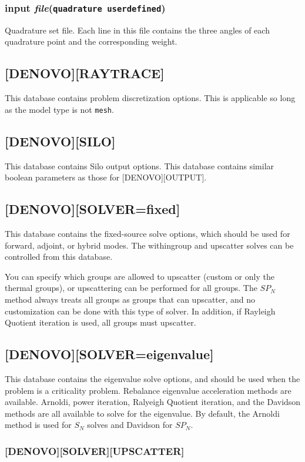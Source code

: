 \documentclass[10pt]{article}
\begin{document}
\subsubsection{input \textit{file}\quad\quad(\texttt{quadrature userdefined})}
Quadrature set file. Each line in this file contains the three angles of each quadrature point and the corresponding weight. 

\subsection{[DENOVO][RAYTRACE]}
This database contains problem discretization options. This is applicable so long as the model type is not \texttt{mesh}.

\subsection{[DENOVO][SILO]}
This database contains Silo output options. This database contains similar boolean parameters as those for [DENOVO][OUTPUT].

\subsection{[DENOVO][SOLVER=fixed]}
This database contains the fixed-source solve options, which should be used for forward, adjoint, or hybrid modes. The withingroup and upscatter solves can be controlled from this database. 

You can specify which groups are allowed to upscatter (custom or only the thermal groups), or upscattering can be performed for all groups. The \(SP_N\) method always treats all groups as groups that can upscatter, and no customization can be done with this type of solver. In addition, if Rayleigh Quotient iteration is used, all groups must upscatter.

\subsection{[DENOVO][SOLVER=eigenvalue]}
This database contains the eigenvalue solve options, and should be used when the problem is a criticality problem. Rebalance eigenvalue acceleration methods are available. Arnoldi, power iteration, Ralyeigh Quotient iteration, and the Davidson methods are all available to solve for the eigenvalue. By default, the Arnoldi method is used for \(S_N\) solves and Davidson for \(SP_N\). 

\subsubsection{[DENOVO][SOLVER][UPSCATTER]}
\end{document}
